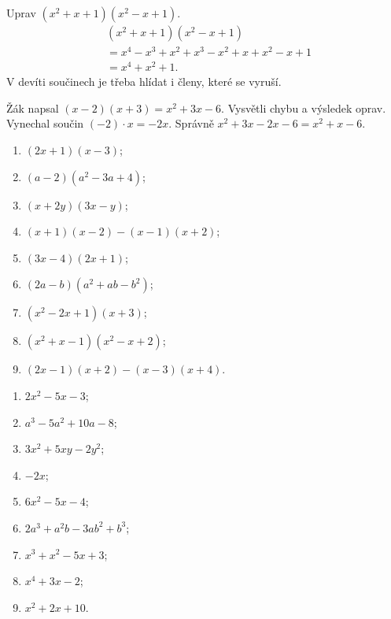 \documentclass[11pt,a4paper]{article}
\begin{document}
\begin{prikladReseniBox}[title={Příklad 3}]
Uprav $(x^2+x+1)(x^2-x+1)$.
\tcblower
\begin{align*}
&(x^2+x+1)(x^2-x+1)\\
&=x^4-x^3+x^2+x^3-x^2+x+x^2-x+1\\
&=x^4+x^2+1.
\end{align*}
V devíti součinech je třeba hlídat i členy, které se vyruší.
\end{prikladReseniBox}
\begin{zadaniReseniBox}[title={Rozšíření 1}]
Žák napsal $(x-2)(x+3)=x^2+3x-6$. Vysvětli chybu a výsledek oprav.
\tcblower
Vynechal součin $(-2)\cdot x=-2x$. Správně $x^2+3x-2x-6=x^2+x-6$.
\end{zadaniReseniBox}
\begin{zadaniReseniBox}[title={Domácí úkol}]
\begin{enumerate}[label=\alph*)]
\item $(2x+1)(x-3)$;
\item $(a-2)(a^2-3a+4)$;
\item $(x+2y)(3x-y)$;
\item $(x+1)(x-2)-(x-1)(x+2)$;
\item $(3x-4)(2x+1)$;
\item $(2a-b)(a^2+ab-b^2)$;
\item $(x^2-2x+1)(x+3)$;
\item $(x^2+x-1)(x^2-x+2)$;
\item $(2x-1)(x+2)-(x-3)(x+4)$.
\end{enumerate}
\tcblower
\begin{enumerate}[label=\alph*)]
\item $2x^2-5x-3$;
\item $a^3-5a^2+10a-8$;
\item $3x^2+5xy-2y^2$;
\item $-2x$;
\item $6x^2-5x-4$;
\item $2a^3+a^2b-3ab^2+b^3$;
\item $x^3+x^2-5x+3$;
\item $x^4+3x-2$;
\item $x^2+2x+10$.
\end{enumerate}
\end{zadaniReseniBox}
\end{document}
